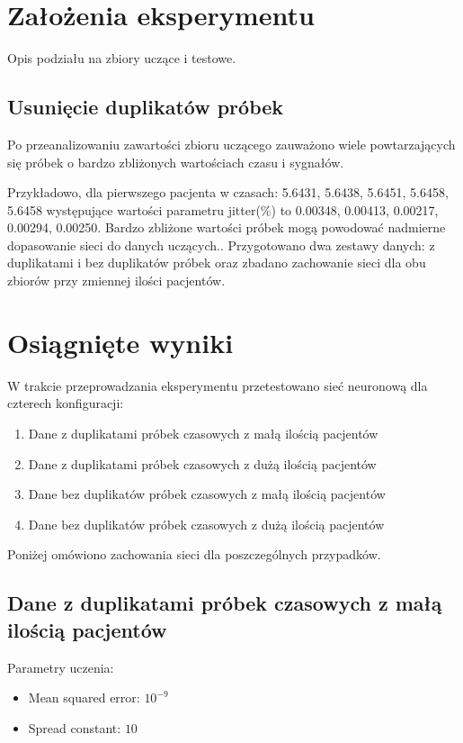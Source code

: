 \documentclass[12pt]{article}
\begin{document}
\newpage
\section{Założenia eksperymentu}
Opis podziału na zbiory uczące i testowe.

\subsection{Usunięcie duplikatów próbek}
Po przeanalizowaniu zawartości zbioru uczącego zauważono wiele powtarzających się próbek o bardzo zbliżonych wartościach czasu i sygnałów. 

Przykładowo, dla pierwszego pacjenta w czasach: 5.6431, 5.6438, 5.6451, 5.6458, 5.6458 występujące wartości parametru jitter(\%) to 0.00348, 0.00413, 0.00217, 0.00294, 0.00250. Bardzo zbliżone wartości próbek mogą powodować nadmierne dopasowanie sieci do danych uczących.. Przygotowano dwa zestawy danych: z duplikatami i bez duplikatów próbek oraz zbadano zachowanie sieci dla obu zbiorów przy zmiennej ilości pacjentów.

\newpage

\section{Osiągnięte wyniki}
W trakcie przeprowadzania eksperymentu przetestowano sieć neuronową dla czterech konfiguracji:

\begin{enumerate}
\item Dane z duplikatami próbek czasowych z małą ilością pacjentów
\item Dane z duplikatami próbek czasowych z dużą ilością pacjentów
\item Dane bez duplikatów próbek czasowych z małą ilością pacjentów
\item Dane bez duplikatów próbek czasowych z dużą ilością pacjentów
\end{enumerate}

Poniżej omówiono zachowania sieci dla poszczególnych przypadków.

\subsection{Dane z duplikatami próbek czasowych z małą ilością pacjentów}

Parametry uczenia:
\begin{itemize}
\item Mean squared error: $10^{-9}$
\item Spread constant: $10$
\end{itemize}
\end{document}
